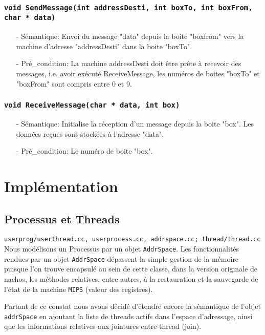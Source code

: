 \documentclass[11pt]{article}
\begin{document}
\subsubsection{\texttt{void SendMessage(int addressDesti, int boxTo, int boxFrom, char * data)}}
\begin{itemize}
\item[-]Sémantique: Envoi du message "data" depuis la boite
 "boxfrom" vers la machine d'adresse "addressDesti" dans la boite "boxTo".
\item[-]Pré\_condition: La machine addressDesti doit être prête à recevoir des messages,
  i.e. avoir exécuté ReceiveMessage, les numéros de boites "boxTo" et "boxFrom" sont compris entre 0 et 9.
\end{itemize}

\subsubsection{\texttt{void ReceiveMessage(char * data, int box)}}
\begin{itemize}
\item[-]Sémantique: Initialise la réception d'un message depuis la boite "box".
  Les données reçues sont stockées à l'adresse "data".
\item[-]Pré\_condition: Le numéro de boite "box".
\end{itemize}



\section{Implémentation}

\subsection{Processus et Threads}
\texttt{userprog/userthread.cc, userprocess.cc, addrspace.cc; thread/thread.cc}
Nous modélisons un Processus par un objet \texttt{AddrSpace}.
Les fonctionnalités rendues par un objet \texttt{AddrSpace} dépassent la simple gestion de la mémoire puisque l'on trouve encapsulé au sein de cette classe, dans la version originale de nachos, les méthodes relatives, entre autres, à la restauration et la sauvegarde de l'état de la machine \texttt{MIPS} (valeur des registres).

Partant de ce constat nous avons décidé d'étendre encore la sémantique de l'objet \texttt{addrSpace} en ajoutant la liste de threads actifs dans l'espace d'adressage, ainsi que les informations relatives aux jointures entre thread (join).
\end{document}
